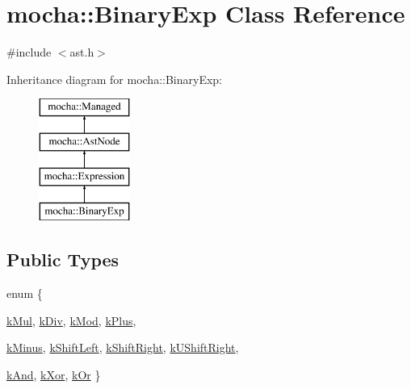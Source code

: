\hypertarget{classmocha_1_1_binary_exp}{
\section{mocha::BinaryExp Class Reference}
\label{classmocha_1_1_binary_exp}
}


{\ttfamily \#include $<$ast.h$>$}

Inheritance diagram for mocha::BinaryExp:\begin{figure}[H]
\begin{center}
\leavevmode
\includegraphics[height=4.000000cm]{classmocha_1_1_binary_exp}
\end{center}
\end{figure}
\subsection*{Public Types}
\begin{DoxyCompactItemize}
\item 
enum \{ \par
\hyperlink{classmocha_1_1_binary_exp_a6556e5472480591fec07f524fed6d093aaf7777a4b57fb6d87e1e12a6267904bf}{kMul}, 
\hyperlink{classmocha_1_1_binary_exp_a6556e5472480591fec07f524fed6d093a7279711d59e87a5fcfbbe205dbc1184a}{kDiv}, 
\hyperlink{classmocha_1_1_binary_exp_a6556e5472480591fec07f524fed6d093acc9cda28bfadceb4b2c95ddebf1206c5}{kMod}, 
\hyperlink{classmocha_1_1_binary_exp_a6556e5472480591fec07f524fed6d093a37a515e229ac071633d53c1d19b3dee2}{kPlus}, 
\par
\hyperlink{classmocha_1_1_binary_exp_a6556e5472480591fec07f524fed6d093a516cfc09844f8a70ce98e71c716f8b75}{kMinus}, 
\hyperlink{classmocha_1_1_binary_exp_a6556e5472480591fec07f524fed6d093abe621824418360cb2190394b5352b2a5}{kShiftLeft}, 
\hyperlink{classmocha_1_1_binary_exp_a6556e5472480591fec07f524fed6d093af5941e749b759bd5b05106a180cceb28}{kShiftRight}, 
\hyperlink{classmocha_1_1_binary_exp_a6556e5472480591fec07f524fed6d093abf9cb82ae717a842d082eaaac4924984}{kUShiftRight}, 
\par
\hyperlink{classmocha_1_1_binary_exp_a6556e5472480591fec07f524fed6d093a164ec266fc1c3539946107eb4f9fad25}{kAnd}, 
\hyperlink{classmocha_1_1_binary_exp_a6556e5472480591fec07f524fed6d093a6e59ebc04a213850d191f81eb617e26b}{kXor}, 
\hyperlink{classmocha_1_1_binary_exp_a6556e5472480591fec07f524fed6d093a2d1f97cad536573b8e69c9f295544586}{kOr}
 \}
\end{DoxyCompactItemize}
